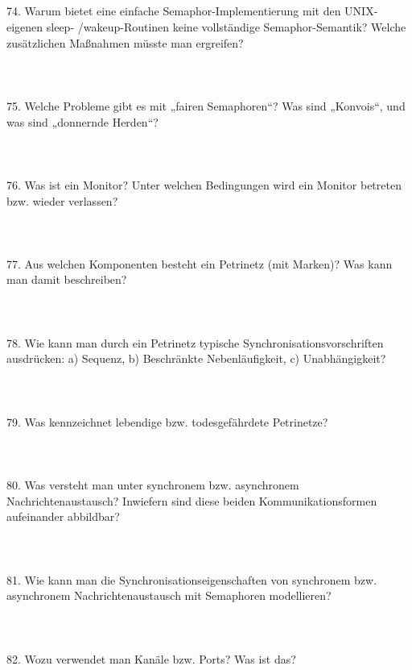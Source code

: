 \documentclass{article}
\begin{document}
\\
\\
\\
\\
74. Warum bietet eine einfache Semaphor-Implementierung mit den UNIX-eigenen sleep-
/wakeup-Routinen keine vollständige Semaphor-Semantik? Welche zusätzlichen Maßnahmen
müsste man ergreifen?
\\
\\
\\
\\
75. Welche Probleme gibt es mit „fairen Semaphoren“? Was sind „Konvois“, und was sind
„donnernde Herden“?
\\
\\
\\
\\
76. Was ist ein Monitor? Unter welchen Bedingungen wird ein Monitor betreten bzw. wieder
verlassen?
\\
\\
\\
\\
77. Aus welchen Komponenten besteht ein Petrinetz (mit Marken)? Was kann man damit
beschreiben?
\\
\\
\\
\\
78. Wie kann man durch ein Petrinetz typische Synchronisationsvorschriften ausdrücken:
a) Sequenz,
b) Beschränkte Nebenläufigkeit,
c) Unabhängigkeit?
\\
\\
\\
\\
79. Was kennzeichnet lebendige bzw. todesgefährdete Petrinetze?
\\
\\
\\
\\
80. Was versteht man unter synchronem bzw. asynchronem Nachrichtenaustausch? Inwiefern
sind diese beiden Kommunikationsformen aufeinander abbildbar?
\\
\\
\\
\\
81. Wie kann man die Synchronisationseigenschaften von synchronem bzw. asynchronem
Nachrichtenaustausch mit Semaphoren modellieren?
\\
\\
\\
\\
82. Wozu verwendet man Kanäle bzw. Ports? Was ist das?
\\
\end{document}
